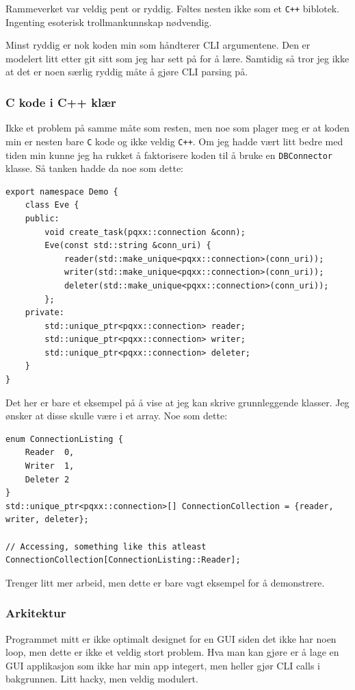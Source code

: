 \documentclass{article}
\begin{document}
Rammeverket var veldig pent or ryddig. Føltes nesten ikke som et \lstinline{C++} biblotek. Ingenting esoterisk trollmankunnskap nødvendig.

Minst ryddig er nok koden min som håndterer CLI argumentene. Den er modelert litt etter git sitt som jeg har sett på for å lære. Samtidig så tror jeg ikke at det er noen særlig ryddig måte å gjøre CLI parsing på.

\subsubsection{C kode i C++ klær}
Ikke et problem på samme måte som resten, men noe som plager meg er at koden min er nesten bare \lstinline{C} kode og ikke veldig \lstinline{C++}. Om jeg hadde vært litt bedre med tiden min kunne jeg ha rukket å faktorisere koden til å bruke en \lstinline{DBConnector} klasse.
Så tanken hadde da noe som dette:
\begin{lstlisting}
export namespace Demo {
    class Eve {
    public:
        void create_task(pqxx::connection &conn);
        Eve(const std::string &conn_uri) {
            reader(std::make_unique<pqxx::connection>(conn_uri));
            writer(std::make_unique<pqxx::connection>(conn_uri));
            deleter(std::make_unique<pqxx::connection>(conn_uri));
        };
    private:
        std::unique_ptr<pqxx::connection> reader;
        std::unique_ptr<pqxx::connection> writer;
        std::unique_ptr<pqxx::connection> deleter;
    }
}
\end{lstlisting}
Det her er bare et eksempel på å vise at jeg kan skrive grunnleggende klasser. Jeg ønsker at disse skulle være i et array. Noe som dette:

\begin{lstlisting}
enum ConnectionListing {
    Reader  0,
    Writer  1,
    Deleter 2
}
std::unique_ptr<pqxx::connection>[] ConnectionCollection = {reader, writer, deleter};

// Accessing, something like this atleast
ConnectionCollection[ConnectionListing::Reader];
\end{lstlisting}

Trenger litt mer arbeid, men dette er bare vagt eksempel for å demonstrere.

\subsubsection{Arkitektur}
Programmet mitt er ikke optimalt designet for en GUI siden det ikke har noen loop, men dette er ikke et veldig stort problem. Hva man kan gjøre er å lage en GUI applikasjon som ikke har min app integert, men heller gjør CLI calls i bakgrunnen. Litt hacky, men veldig modulert.
\end{document}
